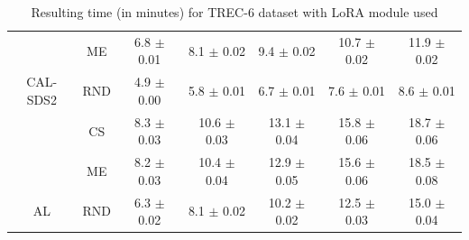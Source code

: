 \begin{table}[htbp]
\begin{tabular*}{\linewidth}{c|c|@{\extracolsep{\fill}}ccccc}
 & ME & 6.8 $\pm$ {\small 0.01} & 8.1 $\pm$ {\small 0.02} & 9.4 $\pm$ {\small 0.02} & 10.7 $\pm$ {\small 0.02} & 11.9 $\pm$ {\small 0.02}\\

\multirow{-3}{*}{\raggedright\arraybackslash CAL-SDS2} & RND & 4.9 $\pm$ {\small 0.00} & 5.8 $\pm$ {\small 0.01} & 6.7 $\pm$ {\small 0.01} & 7.6 $\pm$ {\small 0.01} & 8.6 $\pm$ {\small 0.01}\\
\midrule
 & CS & 8.3 $\pm$ {\small 0.03} & 10.6 $\pm$ {\small 0.03} & 13.1 $\pm$ {\small 0.04} & 15.8 $\pm$ {\small 0.06} & 18.7 $\pm$ {\small 0.06}\\

 & ME & 8.2 $\pm$ {\small 0.03} & 10.4 $\pm$ {\small 0.04} & 12.9 $\pm$ {\small 0.05} & 15.6 $\pm$ {\small 0.06} & 18.5 $\pm$ {\small 0.08}\\

\multirow{-3}{*}{\raggedright\arraybackslash AL} & RND & 6.3 $\pm$ {\small 0.02} & 8.1 $\pm$ {\small 0.02} & 10.2 $\pm$ {\small 0.02} & 12.5 $\pm$ {\small 0.03} & 15.0 $\pm$ {\small 0.04}\\
\bottomrule
\end{tabular*}
\caption{Resulting time (in minutes) for TREC-6 dataset with LoRA module used}
\label{tab:time_full_trec_10_lora}
\end{table}
